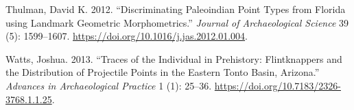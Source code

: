 \documentclass{article}
\newlength{\cslhangindent}
\newlength{\cslentryspacingunit} %
\newenvironment{CSLReferences}[2] %
 {%
  \setlength{\parindent}{0pt}
  \ifodd #1
  \let\oldpar\par
  \def\par{\hangindent=\cslhangindent\oldpar}
  \fi
  \setlength{\parskip}{#2\cslentryspacingunit}
 }%
 {}
\begin{document}
\begin{CSLReferences}{1}{0}
\leavevmode{}%
Thulman, David K. 2012. {``{Discriminating Paleoindian Point Types from
Florida using Landmark Geometric Morphometrics}.''} \emph{Journal of
Archaeological Science} 39 (5): 1599--1607.
\url{https://doi.org/10.1016/j.jas.2012.01.004}.

\leavevmode{}%
Watts, Joshua. 2013. {``{Traces of the Individual in Prehistory:
Flintknappers and the Distribution of Projectile Points in the Eastern
Tonto Basin, Arizona}.''} \emph{Advances in Archaeological Practice} 1
(1): 25--36. \url{https://doi.org/10.7183/2326-3768.1.1.25}.

\end{CSLReferences}



\end{document}
